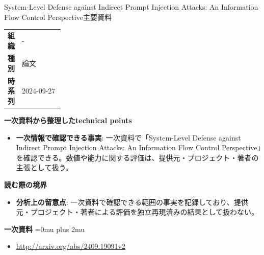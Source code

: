 \begin{technicalnote}{System-Level Defense against Indirect Prompt Injection Attacks: An Information Flow Control Perspective}{主要資料}
\begingroup
\begin{tabularx}{\linewidth}{@{}>{\bfseries}p{0.22\linewidth}X@{}}
組織 & - \\
種別 & 論文 \\
時系列 & 2024-09-27 \\
\end{tabularx}
\smallskip
{\bfseries 一次資料から整理したtechnical points}
\begin{itemize}[leftmargin=1.5em,itemsep=0.35em]
\item \textbf{一次情報で確認できる事実}: 一次資料で「System-Level Defense against Indirect Prompt Injection Attacks: An Information Flow Control Perspective」を確認できる。数値や能力に関する評価は、提供元・プロジェクト・著者の主張として扱う。
\end{itemize}
\begin{minipage}{\linewidth}
{\bfseries 読む際の境界}
\begin{itemize}[leftmargin=1.5em,itemsep=0.35em]
\item \textbf{分析上の留意点}: 一次資料で確認できる範囲の事実を記録しており、提供元・プロジェクト・著者による評価を独立再現済みの結果として扱わない。
\end{itemize}
\begin{samepage}
{\bfseries 一次資料}
\begingroup\sloppy
\Urlmuskip=0mu plus 2mu\relax
\begin{itemize}[leftmargin=1.5em,itemsep=0.25em]
\item {\scriptsize\url{http://arxiv.org/abs/2409.19091v2}}
\end{itemize}
\endgroup
\end{samepage}
\end{minipage}
\endgroup
\end{technicalnote}
\medskip

